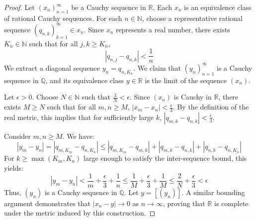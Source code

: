 \begin{proof}
Let $(x_n)_{n=1}^{\infty}$ be a Cauchy sequence in $\mathbb{R}$. Each $x_n$ is an equivalence class of rational Cauchy sequences. For each $n \in \mathbb{N}$, choose a representative rational sequence $(q_{n,k})_{k=1}^{\infty} \in x_n$. Since $x_n$ represents a real number, there exists $K_n \in \mathbb{N}$ such that for all $j, k \ge K_n$,
\[
|q_{n,j} - q_{n,k}| < \frac{1}{n}
\]
We extract a diagonal sequence $y_n = q_{n, K_n}$. We claim that $(y_n)_{n=1}^{\infty}$ is a Cauchy sequence in $\mathbb{Q}$, and its equivalence class $y \in \mathbb{R}$ is the limit of the sequence $(x_n)$.

Let $\epsilon > 0$. Choose $N \in \mathbb{N}$ such that $\frac{3}{N} < \epsilon$. Since $(x_n)$ is Cauchy in $\mathbb{R}$, there exists $M \ge N$ such that for all $m, n \ge M$, $|x_m - x_n| < \frac{\epsilon}{3}$. By the definition of the real metric, this implies that for sufficiently large $k$, $|q_{m,k} - q_{n,k}| < \frac{\epsilon}{3}$.

Consider $m, n \ge M$. We have:
\[
|y_m - y_n| = |q_{m, K_m} - q_{n, K_n}| \le |q_{m, K_m} - q_{m, k}| + |q_{m, k} - q_{n, k}| + |q_{n, k} - q_{n, K_n}|
\]
For $k \ge \max(K_m, K_n)$ large enough to satisfy the inter-sequence bound, this yields:
\[
|y_m - y_n| < \frac{1}{m} + \frac{\epsilon}{3} + \frac{1}{n} \le \frac{1}{M} + \frac{\epsilon}{3} + \frac{1}{M} \le \frac{2}{N} + \frac{\epsilon}{3} < \epsilon
\]
Thus, $(y_n)$ is a Cauchy sequence in $\mathbb{Q}$. Let $y = [(y_n)]$. A similar bounding argument demonstrates that $|x_n - y| \to 0$ as $n \to \infty$, proving that $\mathbb{R}$ is complete under the metric induced by this construction.
\end{proof}